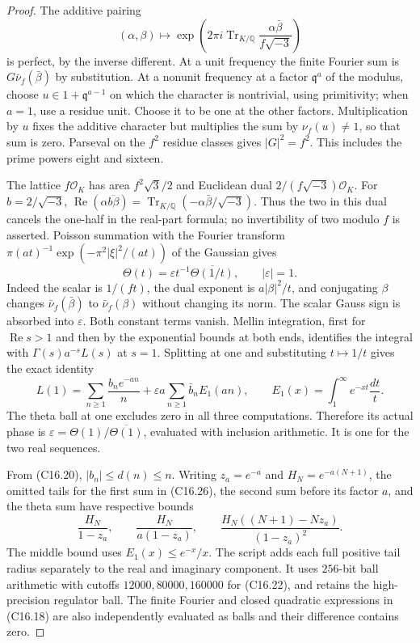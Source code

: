 \begin{proof}
The additive pairing
\[
 (\alpha,\beta)\longmapsto
 \exp\left(2\pi i\operatorname{Tr}_{K/\mathbb Q}
                   \frac{\alpha\bar\beta}{f\sqrt{-3}}\right)
 \tag{C16.24}
\]
is perfect, by the inverse different.  At a unit frequency the
finite Fourier sum is $G\bar\nu_f(\bar\beta)$ by substitution.
At a nonunit frequency at a factor $\mathfrak q^a$ of the modulus,
choose $u\in1+\mathfrak q^{a-1}$ on which the character is
nontrivial, using primitivity; when $a=1$, use a residue unit.
Choose it to be one at the other factors.  Multiplication by $u$
fixes the additive character but multiplies the sum by
$\nu_f(u)\ne1$, so that sum is zero.
Parseval on the $f^2$ residue classes gives $|G|^2=f^2$.
This includes the prime powers eight and sixteen.

The lattice $f\mathcal O_K$ has area $f^2\sqrt3/2$ and
Euclidean dual $2/(f\sqrt{-3})\mathcal O_K$.
For $b=2/\sqrt{-3}$,
$\operatorname{Re}(\alpha\overline{b\beta})
 =\operatorname{Tr}_{K/\mathbb Q}(-\alpha\bar\beta/\sqrt{-3})$.
Thus the two in this dual cancels the one-half in the real-part
formula; no invertibility of two modulo $f$ is asserted.
Poisson summation with the Fourier transform
$\pi(at)^{-1}\exp(-\pi^2|\xi|^2/(at))$ of the Gaussian gives
\[
 \Theta(t)=\varepsilon t^{-1}\overline{\Theta(1/t)},
          \qquad |\varepsilon|=1.
 \tag{C16.25}
\]
Indeed the scalar is $1/(ft)$, the dual exponent is
$a|\beta|^2/t$, and conjugating $\beta$ changes
$\bar\nu_f(\bar\beta)$ to $\bar\nu_f(\beta)$ without changing
its norm.  The scalar Gauss sign is absorbed into $\varepsilon$.
Both constant terms vanish.  Mellin integration, first for
$\operatorname{Re}s>1$ and then by the exponential bounds at both
ends, identifies the integral with $\Gamma(s)a^{-s}L(s)$ at $s=1$.
Splitting at one and substituting $t\mapsto1/t$ gives the exact identity
\[
 L(1)=\sum_{n\ge1}\frac{b_ne^{-an}}n
       +\varepsilon a\sum_{n\ge1}\bar b_n E_1(an),
 \qquad E_1(x)=\int_1^\infty e^{-xt}\frac{dt}{t}.
 \tag{C16.26}
\]
The theta ball at one excludes zero in all three computations.
Therefore its actual phase is
$\varepsilon=\Theta(1)/\overline{\Theta(1)}$, evaluated with
inclusion arithmetic.  It is one for the two real sequences.

From (C16.20), $|b_n|\le d(n)\le n$.
Writing $z_a=e^{-a}$ and $H_N=e^{-a(N+1)}$, the omitted tails
for the first sum in (C16.26), the second sum before its factor
$a$, and the theta sum have respective bounds
\[
 \frac{H_N}{1-z_a},\qquad
 \frac{H_N}{a(1-z_a)},\qquad
 \frac{H_N((N+1)-Nz_a)}{(1-z_a)^2}.
 \tag{C16.27}
\]
The middle bound uses $E_1(x)\le e^{-x}/x$.
The script adds each full positive tail radius separately to the
real and imaginary component.  It uses $256$-bit ball arithmetic
with cutoffs $12000,80000,160000$ for (C16.22), and retains the
high-precision regulator ball.  The finite Fourier and closed
quadratic expressions in (C16.18) are also independently evaluated
as balls and their difference contains zero.


\end{proof}
